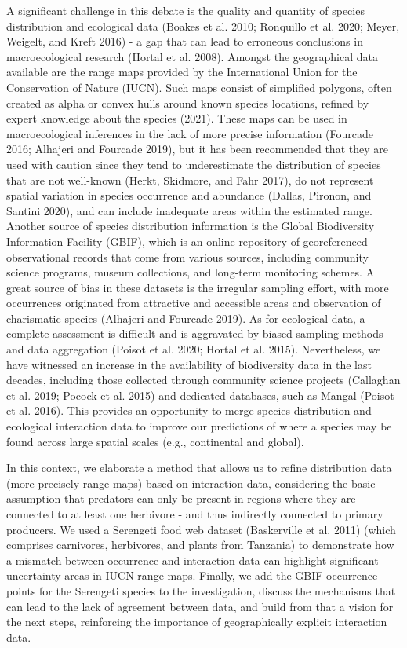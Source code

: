 \documentclass[11pt]{article}
\begin{document}
A significant challenge in this debate is the quality and quantity of
species distribution and ecological data (Boakes et al. 2010; Ronquillo
et al. 2020; Meyer, Weigelt, and Kreft 2016) - a gap that can lead to
erroneous conclusions in macroecological research (Hortal et al. 2008).
Amongst the geographical data available are the range maps provided by
the International Union for the Conservation of Nature (IUCN). Such maps
consist of simplified polygons, often created as alpha or convex hulls
around known species locations, refined by expert knowledge about the
species (2021). These maps can be used in macroecological inferences in
the lack of more precise information (Fourcade 2016; Alhajeri and
Fourcade 2019), but it has been recommended that they are used with
caution since they tend to underestimate the distribution of species
that are not well-known (Herkt, Skidmore, and Fahr 2017), do not
represent spatial variation in species occurrence and abundance (Dallas,
Pironon, and Santini 2020), and can include inadequate areas within the
estimated range. Another source of species distribution information is
the Global Biodiversity Information Facility (GBIF), which is an online
repository of georeferenced observational records that come from various
sources, including community science programs, museum collections, and
long-term monitoring schemes. A great source of bias in these datasets
is the irregular sampling effort, with more occurrences originated from
attractive and accessible areas and observation of charismatic species
(Alhajeri and Fourcade 2019). As for ecological data, a complete
assessment is difficult and is aggravated by biased sampling methods and
data aggregation (Poisot et al. 2020; Hortal et al. 2015). Nevertheless,
we have witnessed an increase in the availability of biodiversity data
in the last decades, including those collected through community science
projects (Callaghan et al. 2019; Pocock et al. 2015) and dedicated
databases, such as Mangal (Poisot et al. 2016). This provides an
opportunity to merge species distribution and ecological interaction
data to improve our predictions of where a species may be found across
large spatial scales (e.g., continental and global).

In this context, we elaborate a method that allows us to refine
distribution data (more precisely range maps) based on interaction data,
considering the basic assumption that predators can only be present in
regions where they are connected to at least one herbivore - and thus
indirectly connected to primary producers. We used a Serengeti food web
dataset (Baskerville et al. 2011) (which comprises carnivores,
herbivores, and plants from Tanzania) to demonstrate how a mismatch
between occurrence and interaction data can highlight significant
uncertainty areas in IUCN range maps. Finally, we add the GBIF
occurrence points for the Serengeti species to the investigation,
discuss the mechanisms that can lead to the lack of agreement between
data, and build from that a vision for the next steps, reinforcing the
importance of geographically explicit interaction data.
\end{document}
